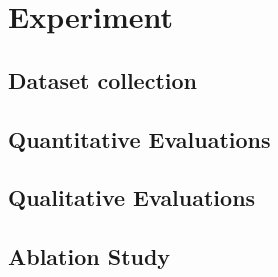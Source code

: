 \section{Experiment}

\subsection{Dataset collection}

\subsection{Quantitative Evaluations}

\subsection{Qualitative Evaluations}

\subsection{Ablation Study}